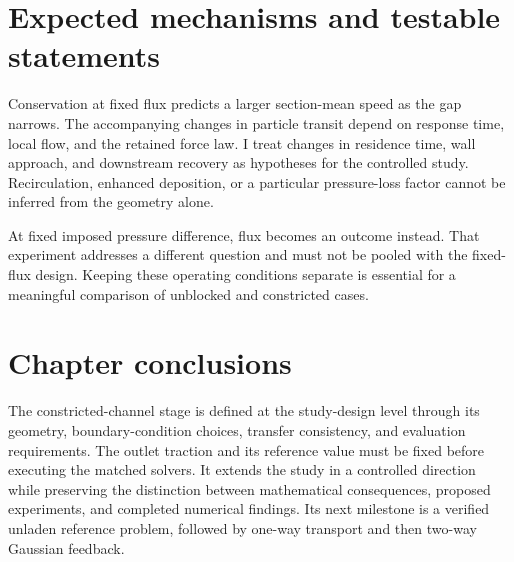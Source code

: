 \section{Expected mechanisms and testable statements}
Conservation at fixed flux predicts a larger section-mean speed as the
gap narrows. The accompanying changes in particle transit depend on
response time, local flow, and the retained force law. I treat changes in
residence time, wall approach, and downstream recovery as hypotheses for
the controlled study. Recirculation, enhanced deposition, or a particular
pressure-loss factor cannot be inferred from the geometry alone.

At fixed imposed pressure difference, flux becomes an outcome instead.
That experiment addresses a different question and must not be pooled with
the fixed-flux design. Keeping these operating conditions separate is
essential for a meaningful comparison of unblocked and constricted cases.

\section{Chapter conclusions}
The constricted-channel stage is defined at the study-design level through
its geometry, boundary-condition choices, transfer consistency, and
evaluation requirements. The outlet traction and its reference value must
be fixed before executing the matched solvers.
It extends the study in a controlled direction while preserving the
distinction between mathematical consequences, proposed experiments, and
completed numerical findings. Its next milestone is a verified unladen
reference problem, followed by one-way transport and then two-way Gaussian
feedback.
